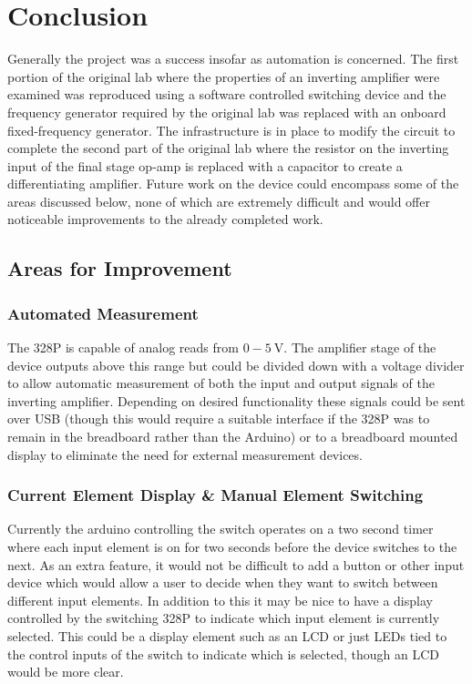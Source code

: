 \documentclass[10pt]{article}
\theoremstyle{definition}
\begin{document}
\section{Conclusion}
Generally the project was a success insofar as automation is concerned. The first portion of the original lab where the properties of 
an inverting amplifier were examined was reproduced using a software controlled switching device and the frequency generator required 
by the original lab was replaced with an onboard fixed-frequency generator. The infrastructure is in place to modify the circuit to 
complete the second part of the original lab where the resistor on the inverting input of the final stage op-amp is replaced
with a capacitor to create a differentiating amplifier. Future work on the device could encompass some of the areas discussed below,
none of which are extremely difficult and would offer noticeable improvements to the already completed work.
\subsection{Areas for Improvement}
\subsubsection{Automated Measurement}
The 328P is capable of analog reads from $0-\qty{5}{\volt}$. The amplifier stage of the device outputs above this range but
could be divided down with a voltage divider to allow automatic measurement of both the input and output signals of the inverting amplifier.
Depending on desired functionality these signals could be sent over USB (though this would require a suitable interface if the 328P was to remain
in the breadboard rather than the Arduino) or to a breadboard mounted display to eliminate the need for external measurement devices.
\subsubsection{Current Element Display \& Manual Element Switching}
Currently the arduino controlling the switch operates on a two second timer where each input element is on for two seconds before the device switches to the next.
As an extra feature, it would not be difficult to add a button or other input device which would allow a user to decide when they want to switch between
different input elements. In addition to this it may be nice to have a display controlled by the switching 328P to indicate which input element is currently selected.
This could be a display element such as an LCD or just LEDs tied to the control inputs of the switch to indicate which is selected, though an LCD
would be more clear.
\end{document}
